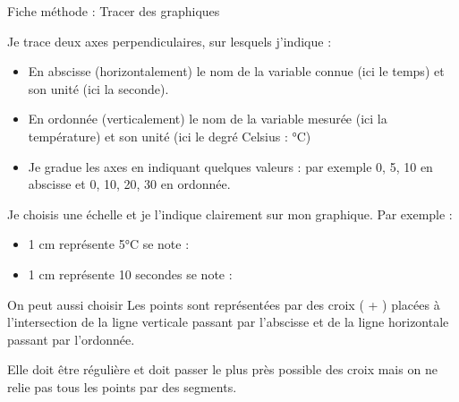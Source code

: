 \documentclass[10pt]{article}
\newcommand{\titre}{Fiche méthode : Tracer des graphiques} %
\begin{document}
\begin{titlebox}{\titre}
    \vspace{5pt}

    \begin{minipage}[l]{0.45\textwidth}
        \centering
        Je trace deux axes perpendiculaires, sur lesquels j’indique :
    \begin{itemize}
        \item En abscisse (horizontalement) le nom de la variable connue (ici le temps) et son unité (ici la seconde).
        \item En ordonnée (verticalement) le nom de la variable mesurée (ici la température) et son unité (ici le degré Celsius : °C)
        \item Je gradue les axes en indiquant quelques valeurs :
        par exemple 0, 5, 10 en abscisse et 0, 10, 20, 30 en ordonnée.
    \end{itemize}
    \end{minipage}
    \hspace{20pt}
    \begin{minipage}[c]{0.45\textwidth}
        \centering
        \hspace{-10pt}
    \end{minipage}
    
    Je choisis une échelle et je l’indique clairement sur mon graphique. Par exemple :
    \begin{itemize}
        \item 1 cm représente 5°C se note : 
        \item 1 cm représente 10 secondes se note : 
    \end{itemize}

    On peut aussi choisir 
    Les points sont représentées par des croix ( + ) placées à l’intersection de la ligne verticale passant par l’abscisse et de la ligne
    horizontale passant par l’ordonnée.

    Elle doit être régulière et doit passer le plus près possible des croix mais on ne relie pas tous les points par des segments.


\end{titlebox}
\end{document}
